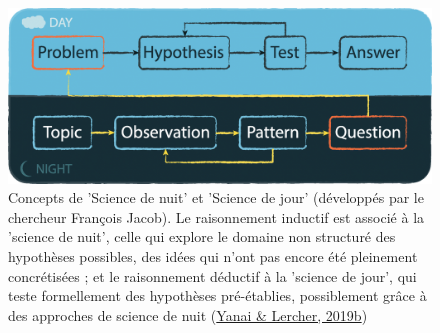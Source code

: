 \documentclass[12pt,twoside]{reedthesis}
\begin{document}
\begin{figure}

{\centering \includegraphics[width=0.9\linewidth]{figure/day_night_science} 

}

\caption[Science de nuit et science de jour]{Concepts de 'Science de nuit' et 'Science de jour' (développés par le chercheur François Jacob). Le raisonnement inductif est associé à la 'science de nuit', celle qui explore le domaine non structuré des hypothèses possibles, des idées qui n'ont pas encore été pleinement concrétisées ; et le raisonnement déductif à la 'science de jour', qui teste formellement des hypothèses pré-établies, possiblement grâce à des approches de science de nuit (\protect\hyperlink{ref-yanai_what_2019}{Yanai \& Lercher, 2019b})}\label{fig:day-night-science}
\end{figure}
\end{document}

